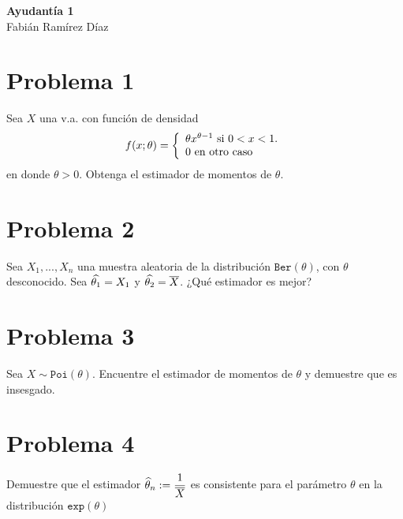 \begin{center}
    \huge{
    \textbf{
        Ayudantía 1
    }
    }\\
    \normalsize{
        Fabián Ramírez Díaz
    }
\end{center}
\section*{Problema 1}
Sea $X$ una v.a. con función de densidad $$f(x;\theta) = \left\{ \begin{array}{lcc} 
\theta x^{\theta-1} \text{ si } 0<x<1.\\
0 \text{ en otro caso}
 \end{array} \right.$$ en donde $\theta >0$. Obtenga el estimador de momentos de $\theta$.
\section*{Problema 2}
Sea $X_1, . . . , X_n$ una muestra aleatoria de la distribución
$\texttt{Ber}(\theta)$, con $\theta$ desconocido. Sea $\widehat{\theta_1} = X_1$ y $\widehat{\theta_2} = \overline{X}$. ¿Qué estimador es mejor?
\section*{Problema 3}
Sea $X\sim\texttt{Poi}(\theta)$. Encuentre el estimador de momentos de $\theta$ y demuestre que es insesgado.
\section*{Problema 4}
Demuestre que el estimador $\widehat{\theta}_n := \dfrac{1}{\overline{X}}$ es consistente para el parámetro $\theta$ en la distribución $\texttt{exp}(\theta)$

\vspace{1cm}
